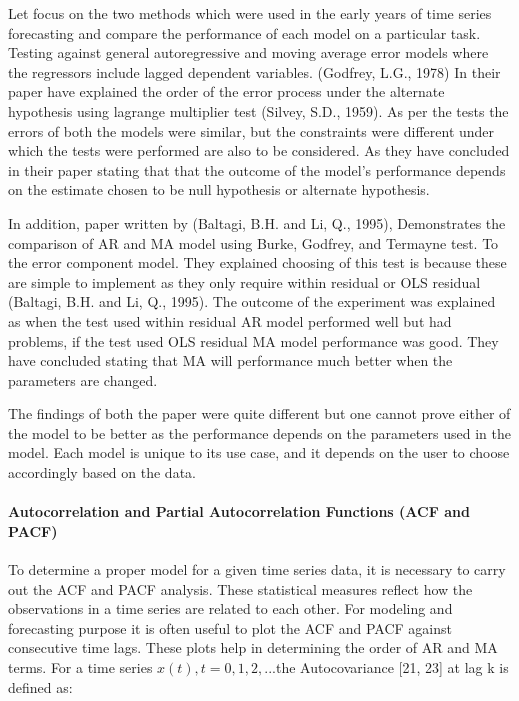 \documentclass[
  onepage,
  openany]{scrbook}
\let\oldparagraph\paragraph
\renewcommand{\paragraph}[1]{\oldparagraph{#1}\mbox{}}
\begin{document}
Let focus on the two methods which were used in the early years of time
series forecasting and compare the performance of each model on a
particular task. Testing against general autoregressive and moving
average error models where the regressors include lagged dependent
variables. (Godfrey, L.G., 1978) In their paper have explained the order
of the error process under the alternate hypothesis using lagrange
multiplier test (Silvey, S.D., 1959). As per the tests the errors of
both the models were similar, but the constraints were different under
which the tests were performed are also to be considered. As they have
concluded in their paper stating that that the outcome of the model's
performance depends on the estimate chosen to be null hypothesis or
alternate hypothesis.

In addition, paper written by (Baltagi, B.H. and Li, Q., 1995),
Demonstrates the comparison of AR and MA model using Burke, Godfrey, and
Termayne test. To the error component model. They explained choosing of
this test is because these are simple to implement as they only require
within residual or OLS residual (Baltagi, B.H. and Li, Q., 1995). The
outcome of the experiment was explained as when the test used within
residual AR model performed well but had problems, if the test used OLS
residual MA model performance was good. They have concluded stating that
MA will performance much better when the parameters are changed.

The findings of both the paper were quite different but one cannot prove
either of the model to be better as the performance depends on the
parameters used in the model. Each model is unique to its use case, and
it depends on the user to choose accordingly based on the data.

\hypertarget{autocorrelation-and-partial-autocorrelation-functions-acf-and-pacf}{%
\paragraph{\texorpdfstring{\textbf{Autocorrelation and Partial
Autocorrelation Functions (ACF and
PACF)}}{Autocorrelation and Partial Autocorrelation Functions (ACF and PACF)}}\label{autocorrelation-and-partial-autocorrelation-functions-acf-and-pacf}}

To determine a proper model for a given time series data, it is
necessary to carry out the ACF and PACF analysis. These statistical
measures reflect how the observations in a time series are related to
each other. For modeling and forecasting purpose it is often useful to
plot the ACF and PACF against consecutive time lags. These plots help in
determining the order of AR and MA terms. For a time series
\({x(t),t = 0,1, 2,...}\)the Autocovariance {[}21, 23{]} at lag k is
defined as:
\end{document}
